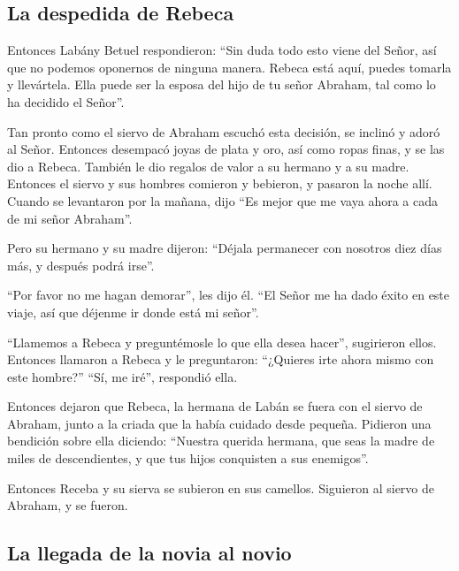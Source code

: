 \hypertarget{la-despedida-de-rebeca}{%
\subsection{La despedida de Rebeca}\label{la-despedida-de-rebeca}}

 Entonces Labány Betuel respondieron: ``Sin duda todo
esto viene del Señor, así que no podemos oponernos de ninguna manera.
 Rebeca está aquí, puedes tomarla y llevártela. Ella
puede ser la esposa del hijo de tu señor Abraham, tal como lo ha
decidido el Señor''.

 Tan pronto como el siervo de Abraham escuchó esta
decisión, se inclinó y adoró al Señor.  Entonces
desempacó joyas de plata y oro, así como ropas finas, y se las dio a
Rebeca. También le dio regalos de valor a su hermano y a su madre.
 Entonces el siervo y sus hombres comieron y bebieron, y
pasaron la noche allí. Cuando se levantaron por la mañana, dijo ``Es
mejor que me vaya ahora a cada de mi señor Abraham''.

 Pero su hermano y su madre dijeron: ``Déjala permanecer
con nosotros diez días más, y después podrá irse''.

 ``Por favor no me hagan demorar'', les dijo él. ``El
Señor me ha dado éxito en este viaje, así que déjenme ir donde está mi
señor''.

 ``Llamemos a Rebeca y preguntémosle lo que ella desea
hacer'', sugirieron ellos.  Entonces llamaron a Rebeca y
le preguntaron: ``¿Quieres irte ahora mismo con este hombre?'' ``Sí, me
iré'', respondió ella.

 Entonces dejaron que Rebeca, la hermana de Labán se
fuera con el siervo de Abraham, junto a la criada que la había cuidado
desde pequeña.  Pidieron una bendición sobre ella
diciendo: ``Nuestra querida hermana, que seas la madre de miles de
descendientes, y que tus hijos conquisten a sus enemigos''.

 Entonces Receba y su sierva se subieron en sus camellos.
Siguieron al siervo de Abraham, y se fueron.

\hypertarget{la-llegada-de-la-novia-al-novio}{%
\subsection{La llegada de la novia al
novio}\label{la-llegada-de-la-novia-al-novio}}

